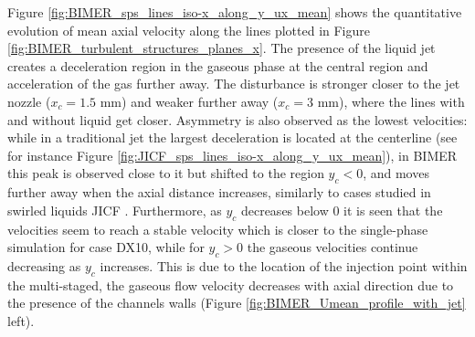 Figure \ref{fig:BIMER_sps_lines_iso-x_along_y_ux_mean} shows the quantitative evolution of mean axial velocity along the lines plotted in Figure \ref{fig:BIMER_turbulent_structures_planes_x}. The presence of the liquid jet creates a deceleration region in the gaseous phase at the central region and acceleration of the gas further away. The disturbance is stronger closer to the jet nozzle ($x_c = 1.5$ mm) and weaker further away ($x_c = 3$ mm), where the lines with and without liquid get closer. Asymmetry is also observed as the lowest velocities: while in a traditional jet the largest deceleration is located at the centerline (see for instance Figure \ref{fig:JICF_sps_lines_iso-x_along_y_ux_mean}), in BIMER this peak is observed close to it but shifted to the region $y_c < 0$, and moves further away when the axial distance increases, similarly to cases studied in swirled liquids JICF . Furthermore, as $y_c$ decreases below $0$ it is seen that the velocities seem to reach a stable velocity which is closer to the single-phase simulation for case DX10, while for $y_c > 0$ the gaseous velocities continue decreasing as $y_c$ increases. This is due to the location of the injection point within the multi-staged, the gaseous flow velocity decreases with axial direction due to the presence of the channels walls (Figure \ref{fig:BIMER_Umean_profile_with_jet} left).





